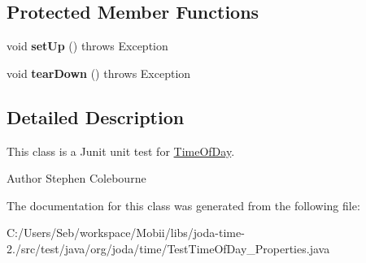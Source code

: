\subsection*{Protected Member Functions}
\begin{DoxyCompactItemize}
\item 
\hypertarget{classorg_1_1joda_1_1time_1_1_test_time_of_day___properties_acad05e598dffcd96a4c54122a78080ac}{void {\bfseries set\-Up} ()  throws Exception }\label{classorg_1_1joda_1_1time_1_1_test_time_of_day___properties_acad05e598dffcd96a4c54122a78080ac}

\item 
\hypertarget{classorg_1_1joda_1_1time_1_1_test_time_of_day___properties_a2daaa029d27c6922f0084ef0b6541bee}{void {\bfseries tear\-Down} ()  throws Exception }\label{classorg_1_1joda_1_1time_1_1_test_time_of_day___properties_a2daaa029d27c6922f0084ef0b6541bee}

\end{DoxyCompactItemize}


\subsection{Detailed Description}
This class is a Junit unit test for \hyperlink{classorg_1_1joda_1_1time_1_1_time_of_day}{Time\-Of\-Day}.

\begin{DoxyAuthor}{Author}
Stephen Colebourne 
\end{DoxyAuthor}


The documentation for this class was generated from the following file\-:\begin{DoxyCompactItemize}
\item 
C\-:/\-Users/\-Seb/workspace/\-Mobii/libs/joda-\/time-\/2./src/test/java/org/joda/time/Test\-Time\-Of\-Day\-\_\-\-Properties.\-java\end{DoxyCompactItemize}
